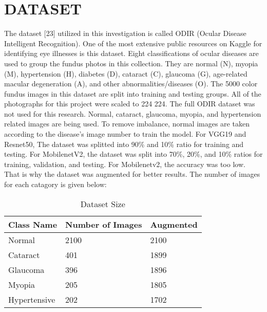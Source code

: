 \chapter{DATASET}
The dataset [23] utilized in this investigation is called ODIR (Ocular Disease Intelligent Recognition). One of the most extensive public resources on Kaggle for identifying eye illnesses is this dataset. Eight classifications of ocular diseases are used to group the fundus photos in this collection. They are normal (N), myopia (M), hypertension (H), diabetes (D), cataract (C), glaucoma (G), age-related macular degeneration (A), and other abnormalities/diseases (O). The 5000 color fundus images in this dataset are split into training and testing groups. All of the photographs for this project were scaled to 224 224. The full ODIR dataset was not used for this research. Normal, cataract, glaucoma, myopia, and hypertension related images are being used. To remove imbalance, normal images are taken according to the disease’s image number to train the model. For VGG19 and Resnet50, The dataset was splitted into 90\% and 10\% ratio for training and testing. For MobilenetV2, the dataset was split into 70\%, 20\%, and 10\% ratios for training, validation, and testing. For Mobilenetv2, the accuracy was too low. That is why the dataset was augmented for better results. The number of images for each catagory is given below: 

\begin{table}[h]
\centering
\caption{Dataset Size}
\begin{tabular}{|l|l|l|} 
\hline
Class Name   & Number of Images & Augmented  \\ 
\hline
Normal       & 2100             & 2100       \\
Cataract     & 401              & 1899       \\
Glaucoma     & 396              & 1896       \\
Myopia       & 205              & 1805       \\
Hypertensive & 202              & 1702       \\
\hline
\end{tabular}
\end{table}



